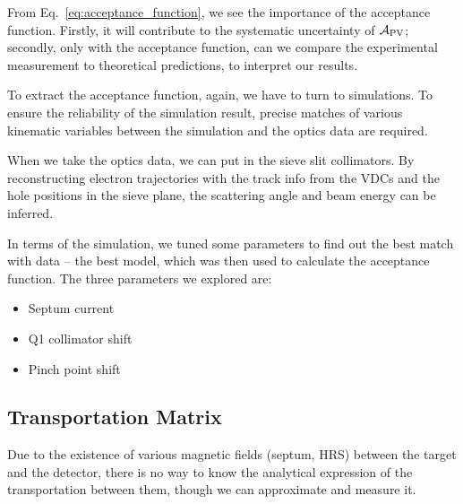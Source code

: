 From Eq.~\ref{eq:acceptance_function}, we see the importance of the acceptance
function. Firstly, it will contribute to the systematic uncertainty of $\mathcal{A}_{\text{PV}}$;
secondly, only with the acceptance function, can we compare
the experimental measurement to theoretical predictions, to interpret our
results.

To extract the acceptance function, again, we have to turn to simulations. 
To ensure the reliability of the simulation result, precise matches of 
various kinematic variables between the simulation and the optics data are required. 

When we take the optics data, we can put in the sieve slit collimators.
By reconstructing electron trajectories with the track info from the VDCs 
and the hole positions in the sieve plane, the scattering angle and beam energy
can be inferred.

In terms of the simulation, we tuned some parameters to find out the best
match with data -- the best model, which was then used to calculate the acceptance
function. The three parameters we explored are:
\begin{itemize}
    \item Septum current
    \item Q1 collimator shift
    \item Pinch point shift
\end{itemize}

\subsection{Transportation Matrix}
Due to the existence of various magnetic fields (septum, HRS) between the target 
and the detector, there is no way to know the analytical expression of the transportation
between them, though we can approximate and measure it.

